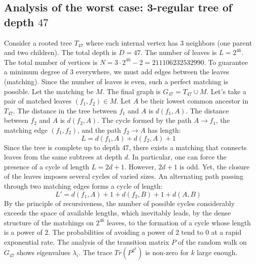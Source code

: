 \documentclass[12pt,a4paper]{article}
\begin{document}
\subsection{Analysis of the worst case: 3-regular tree of depth $47$}
Consider a rooted tree $T_{47}$ where each internal vertex has 3 neighbors (one parent and two children).
The total depth is $D = 47$.
The number of leaves is $L = 2^{46}$.
The total number of vertices is $N = 3 \cdot 2^{46} - 2 = 211106232532990$.
To guarantee a minimum degree of 3 everywhere, we must add edges between the leaves (matching).
Since the number of leaves is even, such a perfect matching is possible.
Let the matching be $M$. The final graph is $G_{47} = T_{47} \cup M$.
Let's take a pair of matched leaves $(f_1, f_2) \in M$.
Let $A$ be their lowest common ancestor in $T_{47}$.
The distance in the tree between $f_1$ and $A$ is $d(f_1, A)$.
The distance between $f_2$ and $A$ is $d(f_2, A)$.
The cycle formed by the path $A \to f_1$, the matching edge $(f_1, f_2)$, and the path $f_2 \to A$ has length:
$$ L = d(f_1, A) + d(f_2, A) + 1 $$
Since the tree is complete up to depth $47$, there exists a matching that connects leaves from the same subtrees at depth $d$.
In particular, one can force the presence of a cycle of length $L = 2d + 1$. However, $2d+1$ is odd.
Yet, the closure of the leaves imposes several cycles of varied sizes. An alternating path passing through two matching edges forms a cycle of length:
$$ L' = d(f_1, A) + 1 + d(f_2, B) + 1 + d(A, B) $$
By the principle of recursiveness, the number of possible cycles considerably exceeds the space of available lengths, which inevitably leads, by the dense structure of the matchings on $2^{46}$ leaves, to the formation of a cycle whose length is a power of 2. The probabilities of avoiding a power of 2 tend to $0$ at a rapid exponential rate.
The analysis of the transition matrix $P$ of the random walk on $G_{47}$ shows eigenvalues $\lambda_i$. The trace $Tr(P^{2^k})$ is non-zero for $k$ large enough.
\end{document}
